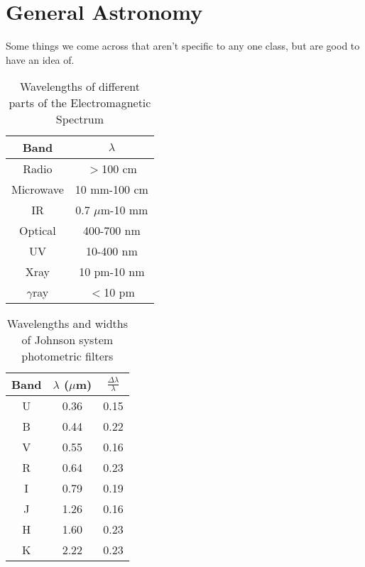 \section{General Astronomy}
Some things we come across that aren't specific to any one class, but are 
good to have an idea of.

\begin{table}[H]
\centering
\begin{tabular}{c c}
\hline\hline
Band&$\lambda$\\
\hline
Radio&$>$100 cm\\
Microwave&10 mm-100 cm\\
IR&0.7 $\mu$m-10 mm\\
Optical&400-700 nm\\
UV&10-400 nm\\
Xray&10 pm-10 nm\\
$\gamma$ray&$<$10  pm\\
\hline\hline
\end{tabular}
\caption{Wavelengths of different parts of the Electromagnetic Spectrum}
\end{table}

\begin{table}[H]
\centering
\begin{tabular}{c c c}
\hline\hline
Band&$\lambda$ ($\mu$m)&$\frac{\Delta\lambda}{\lambda}$\\
\hline
U&0.36&0.15\\
B&0.44&0.22\\
V&0.55&0.16\\
R&0.64&0.23\\
I&0.79&0.19\\
J&1.26&0.16\\
H&1.60&0.23\\
K&2.22&0.23\\
\hline\hline
\end{tabular}
\caption{Wavelengths and widths of Johnson system photometric filters}
\end{table}

